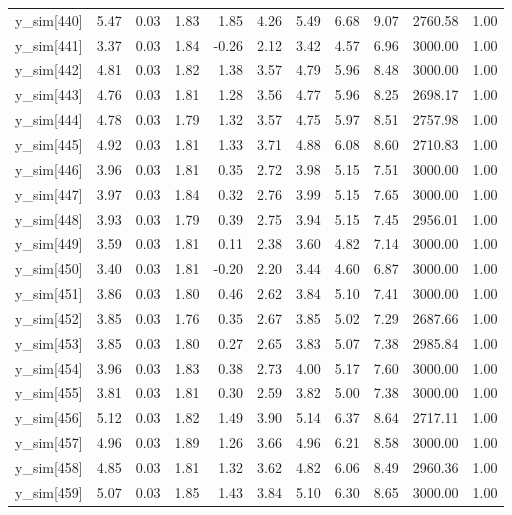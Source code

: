 \begin{table}[ht]
\begin{tabular}{rrrrrrrrrrr}
  y\_sim[440] & 5.47 & 0.03 & 1.83 & 1.85 & 4.26 & 5.49 & 6.68 & 9.07 & 2760.58 & 1.00 \\ 
  y\_sim[441] & 3.37 & 0.03 & 1.84 & -0.26 & 2.12 & 3.42 & 4.57 & 6.96 & 3000.00 & 1.00 \\ 
  y\_sim[442] & 4.81 & 0.03 & 1.82 & 1.38 & 3.57 & 4.79 & 5.96 & 8.48 & 3000.00 & 1.00 \\ 
  y\_sim[443] & 4.76 & 0.03 & 1.81 & 1.28 & 3.56 & 4.77 & 5.96 & 8.25 & 2698.17 & 1.00 \\ 
  y\_sim[444] & 4.78 & 0.03 & 1.79 & 1.32 & 3.57 & 4.75 & 5.97 & 8.51 & 2757.98 & 1.00 \\ 
  y\_sim[445] & 4.92 & 0.03 & 1.81 & 1.33 & 3.71 & 4.88 & 6.08 & 8.60 & 2710.83 & 1.00 \\ 
  y\_sim[446] & 3.96 & 0.03 & 1.81 & 0.35 & 2.72 & 3.98 & 5.15 & 7.51 & 3000.00 & 1.00 \\ 
  y\_sim[447] & 3.97 & 0.03 & 1.84 & 0.32 & 2.76 & 3.99 & 5.15 & 7.65 & 3000.00 & 1.00 \\ 
  y\_sim[448] & 3.93 & 0.03 & 1.79 & 0.39 & 2.75 & 3.94 & 5.15 & 7.45 & 2956.01 & 1.00 \\ 
  y\_sim[449] & 3.59 & 0.03 & 1.81 & 0.11 & 2.38 & 3.60 & 4.82 & 7.14 & 3000.00 & 1.00 \\ 
  y\_sim[450] & 3.40 & 0.03 & 1.81 & -0.20 & 2.20 & 3.44 & 4.60 & 6.87 & 3000.00 & 1.00 \\ 
  y\_sim[451] & 3.86 & 0.03 & 1.80 & 0.46 & 2.62 & 3.84 & 5.10 & 7.41 & 3000.00 & 1.00 \\ 
  y\_sim[452] & 3.85 & 0.03 & 1.76 & 0.35 & 2.67 & 3.85 & 5.02 & 7.29 & 2687.66 & 1.00 \\ 
  y\_sim[453] & 3.85 & 0.03 & 1.80 & 0.27 & 2.65 & 3.83 & 5.07 & 7.38 & 2985.84 & 1.00 \\ 
  y\_sim[454] & 3.96 & 0.03 & 1.83 & 0.38 & 2.73 & 4.00 & 5.17 & 7.60 & 3000.00 & 1.00 \\ 
  y\_sim[455] & 3.81 & 0.03 & 1.81 & 0.30 & 2.59 & 3.82 & 5.00 & 7.38 & 3000.00 & 1.00 \\ 
  y\_sim[456] & 5.12 & 0.03 & 1.82 & 1.49 & 3.90 & 5.14 & 6.37 & 8.64 & 2717.11 & 1.00 \\ 
  y\_sim[457] & 4.96 & 0.03 & 1.89 & 1.26 & 3.66 & 4.96 & 6.21 & 8.58 & 3000.00 & 1.00 \\ 
  y\_sim[458] & 4.85 & 0.03 & 1.81 & 1.32 & 3.62 & 4.82 & 6.06 & 8.49 & 2960.36 & 1.00 \\ 
  y\_sim[459] & 5.07 & 0.03 & 1.85 & 1.43 & 3.84 & 5.10 & 6.30 & 8.65 & 3000.00 & 1.00 \\ 

\end{tabular}
\end{table}
